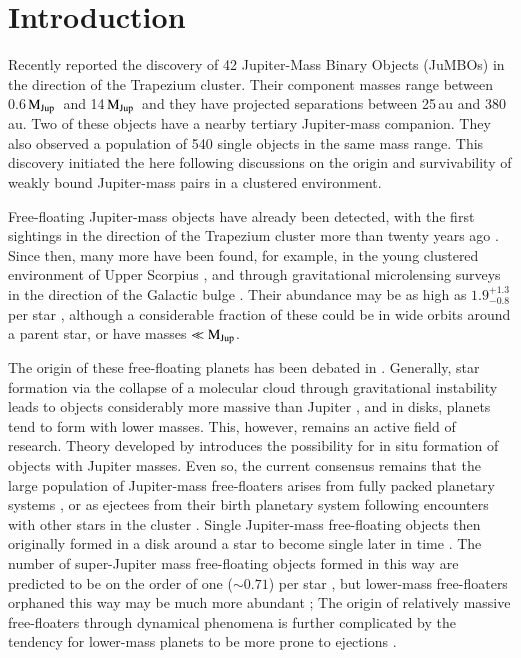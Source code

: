 \documentclass[submission,phys]{lib/SciPost}
\newcommand{\MJup}{\mbox{$\mathrm{{M}}_{\rm Jup}$}}
\newcommand{\jumbos}{\mbox{JuMBOs}}
\begin{document}
\section{Introduction}

Recently \cite{2023arXiv231001231P} reported the discovery of 42
Jupiter-Mass Binary Objects (\jumbos) in the direction of the
Trapezium cluster.  Their component masses range between 0.6\,\MJup\,
and 14\,\MJup\, and they have projected separations between 25\,au and
380\,au.  Two of these objects have a nearby tertiary Jupiter-mass
companion.  They also observed a population of 540 single objects in
the same mass range. This discovery initiated the here following
discussions on the origin and survivability of weakly bound
Jupiter-mass pairs in a clustered environment.

Free-floating Jupiter-mass objects have already been detected, with the first 
sightings in the direction of the Trapezium cluster more than twenty years ago \cite{2000Sci...290..103Z,2000MNRAS.314..858L,2000AGM....17..A11M}.
Since then, many more have been found, for example, in the young
clustered environment of Upper Scorpius \cite{2022NatAs...6...89M},
and through gravitational microlensing surveys in the direction of the
Galactic bulge \cite{2011Natur.473..349S}.  Their abundance may be as
high as $1.9^{+1.3}_{-0.8}$ per star \cite{2011Natur.473..349S},
although a considerable fraction of these could be in wide orbits
around a parent star, or have masses $\ll \MJup$.

The origin of these free-floating planets has been debated in
\cite{2023Ap&SS.368...17M}. Generally, star formation via the collapse
of a molecular cloud through gravitational instability leads to
objects considerably more massive than Jupiter
\cite{1976MNRAS.176..367L,2005A&A...430.1059B}, and in disks, planets
tend to form with lower masses. This, however, remains an active field
of research. Theory developed by \cite{2006A&A...458..817W} introduces
the possibility for in situ formation of objects with Jupiter
masses. Even so, the current consensus remains that the large
population of Jupiter-mass free-floaters arises from fully packed
planetary systems \cite{2023arXiv231015603C}, or as ejectees from
their birth planetary system following encounters with other stars in
the cluster \cite{2019A&A...624A.120V}.  Single Jupiter-mass
free-floating objects then originally formed in a disk around a star
to become single later in time
\cite{1996Sci...274..954R,2015MNRAS.453.2759Z,2002ApJ...565.1251H,
  2017MNRAS.470.4337C, 2019MNRAS.489.2280F,2019A&A...624A.120V}.  The
number of super-Jupiter mass free-floating objects formed in this way
are predicted to be on the order of one ($\sim 0.71$) per star
\cite{2019A&A...624A.120V}, but lower-mass free-floaters orphaned this
way may be much more abundant \cite{2002ApJ...565.1251H}; The origin
of relatively massive free-floaters through dynamical phenomena is
further complicated by the tendency for lower-mass planets to be more
prone to ejections \cite{2001Icar..150..303F,2013MNRAS.433..867H,
  2019MNRAS.489.2280F,2020MNRAS.497.1807S}.
\end{document}
